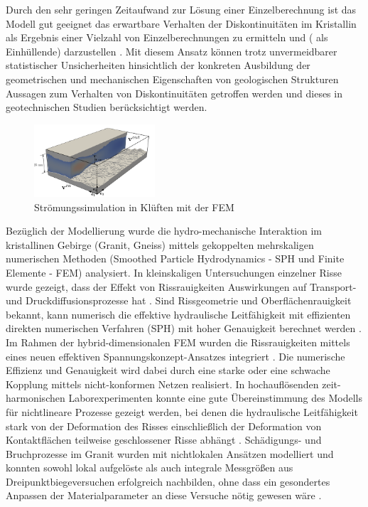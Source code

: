 Durch den sehr geringen Zeitaufwand zur Lösung einer Einzelberechnung ist das Modell gut geeignet das erwartbare Verhalten der Diskontinuitäten im Kristallin als Ergebnis einer Vielzahl von Einzelberechnungen zu ermitteln und ( als Einhüllende) darzustellen . 
Mit diesem Ansatz können trotz unvermeidbarer statistischer Unsicherheiten hinsichtlich der konkreten Ausbildung der geometrischen und mechanischen Eigenschaften von geologischen Strukturen Aussagen zum Verhalten von Diskontinuitäten getroffen werden und dieses in geotechnischen Studien berücksichtigt werden.

\begin{figure}
\vspace{-5mm}
\includegraphics[width=0.4\textwidth]{figures/geomint-me08-01.png}
\caption{Strömungssimulation in Klüften mit der FEM \cite{steeb-2020c}}
\label{fig:wp3-results}
\end{figure}
%
Bezüglich der Modellierung wurde die hydro-mechanische Interaktion im kristallinen Gebirge (Granit, Gneiss) mittels gekoppelten mehrskaligen numerischen Methoden (Smoothed Particle Hydrodynamics - SPH und Finite Elemente - FEM) analysiert. In kleinskaligen Untersuchungen einzelner Risse wurde gezeigt, dass der Effekt von Rissrauigkeiten Auswirkungen auf Transport- und Druckdiffusionsprozesse hat \cite{steeb-2019b}. Sind Rissgeometrie und Oberflächenrauigkeit bekannt, kann numerisch die effektive hydraulische Leitfähigkeit mit effizienten direkten numerischen Verfahren (SPH) mit hoher Genauigkeit berechnet werden \cite{steeb-2019b}. Im Rahmen der hybrid-dimensionalen FEM wurden die Rissrauigkeiten mittels eines neuen effektiven Spannungskonzept-Ansatzes integriert \cite{schmidt2019}.
Die numerische Effizienz und Genauigkeit wird dabei durch eine starke oder eine schwache Kopplung mittels nicht-konformen Netzen realisiert.
%
In hochauflösenden zeit-harmonischen Laborexperimenten konnte eine gute Übereinstimmung des Modells für nichtlineare Prozesse gezeigt werden, bei denen die hydraulische Leitfähigkeit stark von der Deformation des Risses einschließlich der Deformation von Kontaktflächen teilweise geschlossener Risse abhängt \cite{steeb-2020a}.
%
Schädigungs- und Bruchprozesse im Granit wurden mit nichtlokalen Ansätzen modelliert und konnten sowohl lokal aufgelöste als auch integrale Messgrößen aus Dreipunktbiegeversuchen erfolgreich nachbilden, ohne dass ein gesondertes Anpassen der Materialparameter an diese Versuche nötig gewesen wäre \cite{Parisio2019102}.

